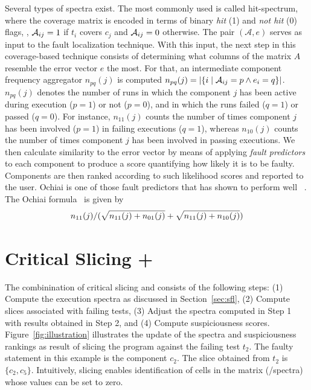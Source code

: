 \documentclass[sigplan,10pt,review,anonymous]{acmart}\settopmatter{printfolios=true,printccs=false,printacmref=false}
\begin{document}
Several types of spectra exist.  The most commonly used is called
hit-spectrum, where the coverage matrix is encoded in terms of binary
\emph{hit} (1) and \emph{not hit} (0) flags, \ie{}, $\mathcal{A}_{ij} = 1$ if
$t_i$ covers $c_j$ and $\mathcal{A}_{ij} = 0$ otherwise.  The pair
$(\mathcal{A},e)$ serves as input to the fault localization technique.
With this input, the next step in this coverage-based technique
consists of determining what columns of the matrix $A$ resemble the
error vector $e$ the most.  For that, an intermediate component
frequency aggregator $n_{pq}(j)$ is computed $n_{pq}(j) = |\{i\mid
\mathcal{A}_{ij}=p \wedge e_i=q\}|$. $n_{pq}(j)$ denotes the number of runs in
which the component $j$ has been active during execution ($p = 1$) or
not ($p=0$), and in which the runs failed ($q = 1$) or passed ($q =
0$).  For instance, $n_{11}(j)$ counts the number of times component
$j$ has been involved ($p = 1$) in failing executions ($q = 1$),
whereas $n_{10}(j)$ counts the number of times component $j$ has been
involved in passing executions. We then calculate similarity to the
error vector by means of applying \emph{fault predictors} to each
component to produce a score quantifying how likely it is to be
faulty.  Components are then ranked according to such likelihood
scores and reported to the user. Ochiai is one of those fault
predictors that has shown to perform well ~\cite{Pearson:2017:EIF:3097368.3097441,7390282}.
The Ochiai formula~\cite{DBLP:conf/prdc/AbreuZG06} is given by
\[n_{11}(j)/(\sqrt{n_{11}(j)+n_{01}(j)} + \sqrt{n_{11}(j)+n_{10}(j)})\]

\section{Critical Slicing + \sfl{}}
\label{sec:combination}

The combinination of critical slicing and \sfl{} consists of the
following steps: (1) Compute the execution spectra as discussed in
Section~\ref{sec:sfl}, (2) Compute slices associated with failing
tests, (3) Adjust the spectra computed in Step 1 with results obtained
in Step 2, and (4) Compute suspiciousness
scores. Figure~\ref{fig:illustration} illustrates the update of the
spectra and suspiciousness rankings as result of slicing the program
against the failing test $t_2$. The faulty statement in this example
is the component $c_2$.  The slice obtained from $t_2$ is $\{c_2,
c_5\}$.  Intuitively, slicing enables identification of cells in the
matrix (/spectra) whose values can be set to zero.

\end{document}
